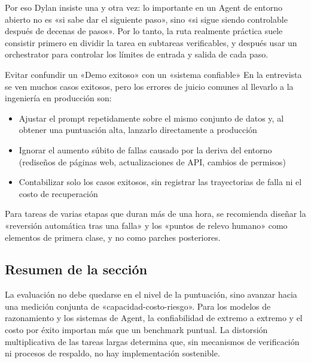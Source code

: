 Por eso Dylan insiste una y otra vez: lo importante en un Agent de entorno abierto no es «si sabe dar el siguiente paso», sino «si sigue siendo controlable después de decenas de pasos». Por lo tanto, la ruta realmente práctica suele consistir primero en dividir la tarea en subtareas verificables, y después usar un orchestrator para controlar los límites de entrada y salida de cada paso.

\begin{warningbox}{Evitar confundir un «Demo exitoso» con un «sistema confiable»}
En la entrevista se ven muchos casos exitosos, pero los errores de juicio comunes al llevarlo a la ingeniería en producción son:
\begin{itemize}
    \item Ajustar el prompt repetidamente sobre el mismo conjunto de datos y, al obtener una puntuación alta, lanzarlo directamente a producción
    \item Ignorar el aumento súbito de fallas causado por la deriva del entorno (rediseños de páginas web, actualizaciones de API, cambios de permisos)
    \item Contabilizar solo los casos exitosos, sin registrar las trayectorias de falla ni el costo de recuperación
\end{itemize}

Para tareas de varias etapas que duran más de una hora, se recomienda diseñar la «reversión automática tras una falla» y los «puntos de relevo humano» como elementos de primera clase, y no como parches posteriores.
\end{warningbox}

\subsection{Resumen de la sección}

La evaluación no debe quedarse en el nivel de la puntuación, sino avanzar hacia una medición conjunta de «capacidad-costo-riesgo». Para los modelos de razonamiento y los sistemas de Agent, la confiabilidad de extremo a extremo y el costo por éxito importan más que un benchmark puntual. La distorsión multiplicativa de las tareas largas determina que, sin mecanismos de verificación ni procesos de respaldo, no hay implementación sostenible.
